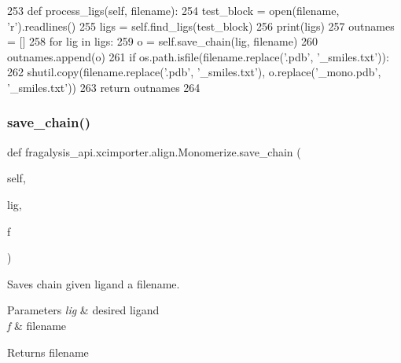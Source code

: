 \begin{DoxyCode}
253     \textcolor{keyword}{def }process\_ligs(self, filename):
254         test\_block = open(filename, \textcolor{stringliteral}{'r').readlines()}
255 \textcolor{stringliteral}{        ligs = self.find\_ligs(test\_block)}
256 \textcolor{stringliteral}{        print(ligs)}
257 \textcolor{stringliteral}{        outnames = []}
258 \textcolor{stringliteral}{        }\textcolor{keywordflow}{for} lig \textcolor{keywordflow}{in} ligs:
259             o = self.save\_chain(lig, filename)
260             outnames.append(o)
261             \textcolor{keywordflow}{if} os.path.isfile(filename.replace(\textcolor{stringliteral}{'.pdb'}, \textcolor{stringliteral}{'\_smiles.txt'})):
262                 shutil.copy(filename.replace(\textcolor{stringliteral}{'.pdb'}, \textcolor{stringliteral}{'\_smiles.txt'}), o.replace(\textcolor{stringliteral}{'\_mono.pdb'}, \textcolor{stringliteral}{'\_smiles.txt'}))
263         \textcolor{keywordflow}{return} outnames
264 
\end{DoxyCode}
\mbox{\label{classfragalysis__api_1_1xcimporter_1_1align_1_1_monomerize_a7dc86cd770a6c7532e96b0f45d91dc2b}} 
\subsubsection{\texorpdfstring{save\+\_\+chain()}{save\_chain()}}
{\footnotesize\ttfamily def fragalysis\+\_\+api.\+xcimporter.\+align.\+Monomerize.\+save\+\_\+chain (\begin{DoxyParamCaption}\item[{}]{self,  }\item[{}]{lig,  }\item[{}]{f }\end{DoxyParamCaption})}



Saves chain given ligand a filename. 


\begin{DoxyParams}{Parameters}
{\em lig} & desired ligand \\
\hline
{\em f} & filename \\
\hline
\end{DoxyParams}
\begin{DoxyReturn}{Returns}
filename 
\end{DoxyReturn}


